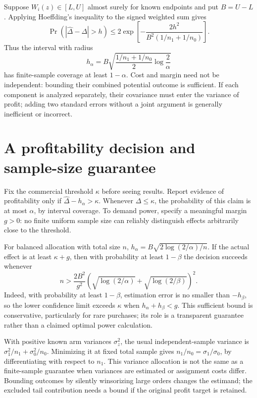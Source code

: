 \documentclass[11pt]{article}
\begin{document}
Suppose $W_i(z)\in[L,U]$ almost surely for known endpoints and put $B=U-L$. Applying Hoeffding's inequality to the signed weighted sum gives
\[
 \Pr(|\widehat\Delta-\Delta|>h)
 \leq2\exp\left[-\frac{2h^2}{B^2(1/n_1+1/n_0)}\right].
\]
Thus the interval with radius
\[
 h_\alpha=B\sqrt{\frac{1/n_1+1/n_0}{2}\log\frac2\alpha}
\]
has finite-sample coverage at least $1-\alpha$. Cost and margin need not be independent: bounding their combined potential outcome is sufficient. If each component is analyzed separately, their covariance must enter the variance of profit; adding two standard errors without a joint argument is generally inefficient or incorrect.

\section{A profitability decision and sample-size guarantee}
Fix the commercial threshold $\kappa$ before seeing results. Report evidence of profitability only if $\widehat\Delta-h_\alpha>\kappa$. Whenever $\Delta\leq\kappa$, the probability of this claim is at most $\alpha$, by interval coverage. To demand power, specify a meaningful margin $g>0$: no finite uniform sample size can reliably distinguish effects arbitrarily close to the threshold.

For balanced allocation with total size $n$, $h_\alpha=B\sqrt{2\log(2/\alpha)/n}$. If the actual effect is at least $\kappa+g$, then with probability at least $1-\beta$ the decision succeeds whenever
\[
 n>\frac{2B^2}{g^2}
       \left(\sqrt{\log(2/\alpha)}+\sqrt{\log(2/\beta)}\right)^2.
\]
Indeed, with probability at least $1-\beta$, estimation error is no smaller than $-h_\beta$, so the lower confidence limit exceeds $\kappa$ when $h_\alpha+h_\beta<g$. This sufficient bound is conservative, particularly for rare purchases; its role is a transparent guarantee rather than a claimed optimal power calculation.

With positive known arm variances $\sigma_z^2$, the usual independent-sample variance is $\sigma_1^2/n_1+\sigma_0^2/n_0$. Minimizing it at fixed total sample gives $n_1/n_0=\sigma_1/\sigma_0$, by differentiating with respect to $n_1$. This variance allocation is not the same as a finite-sample guarantee when variances are estimated or assignment costs differ. Bounding outcomes by silently winsorizing large orders changes the estimand; the excluded tail contribution needs a bound if the original profit target is retained.
\end{document}

